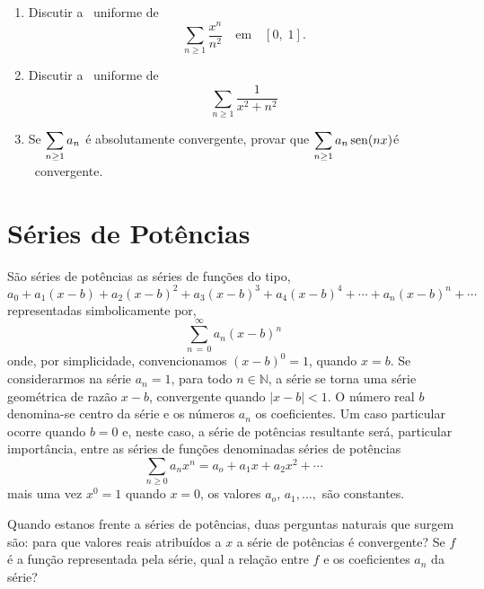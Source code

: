 \begin{enumerate}[label=(\arabic*)]
\item Discutir a \conv\ uniforme de
\begin{equation*}
  \sum_{n\geq 1}\frac{x^n}{n^2}  \quad \text{em}\quad  [0,\; 1].
\end{equation*}

\item Discutir a \conv\ uniforme de
\begin{equation*}
  \sum_{n\geq 1}\frac{1}{x^2+n^2}
\end{equation*}

\item Se $\displaystyle{\sum_{n\geq 1}a_n}$ \'e absolutamente convergente,
provar que $\displaystyle{\sum_{n\geq 1}a_n\operatorname{sen}(nx)}$\'e \unif\
convergente.
\end{enumerate}

\section{Séries de Potências}

São séries de potências as séries de funções do tipo,
\begin{equation*}
a_{0}+a_{1}(x-b)+a_{2}(x-b)^{2}+a_{3}(x-b)^{3}+a_{4}(x-b)^{4}+\cdots+ a_{n}(x-b)^{n}+\cdots 
\end{equation*}
representadas simbolicamente por,
\begin{equation*}
  \sum_{n\,=\, 0}^{\infty}a_{n}(x-b)^{n}
\end{equation*}
onde, por simplicidade, convencionamos \((x-b)^{0} = 1\), quando \(x = b\). Se considerarmos na série \(a_{n}=1\), para
todo \(n \in \mathbb{N}\), a série se torna uma série geométrica de razão \(x-b\), convergente quando \(|x-b| < 1\). O número real \(b\)
denomina-se centro da série e os números \(a_{n}\) os coeficientes. Um caso particular ocorre quando \(b=0\) e, neste
caso, a série de potências resultante será, particular importância, entre as séries de funções 
denominadas séries de potências
\begin{equation*}
  \sum_{n\geq 0}a_nx^n = a_o + a_1x + a_2x^2 +\cdots
\end{equation*}
 mais uma vez \(x^{0}=1\) quando \(x=0\), os valores $a_o$, $a_1,\ldots,$ são constantes. 

Quando estanos frente a séries de potências, duas perguntas naturais que surgem são: para que valores reais
atribuídos a \(x\) a série de potências é convergente? Se \(f\) é a função representada pela série, qual 
a relação entre \(f\) e os coeficientes \(a_{n}\) da série?

